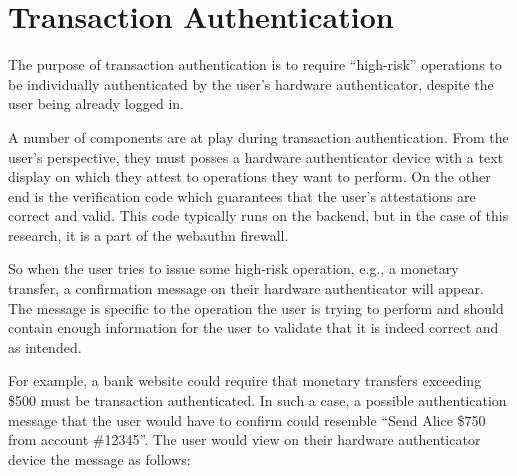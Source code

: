 
\section{Transaction Authentication}

\iffalse
Transaction authentication defends against a class of vulnerabilities not covered by traditional two-factor authentication. 
\fi

The purpose of transaction authentication is to require ``high-risk'' operations to be individually authenticated by the user's hardware authenticator, despite the user being already logged in. 

A number of components are at play during transaction authentication. From the user's perspective, they must posses a hardware authenticator device with a text display on which they attest to operations they want to perform. On the other end is the verification code which guarantees that the user's attestations are correct and valid. This code typically runs on the backend, but in the case of this research, it is a part of the webauthn firewall.

So when the user tries to issue some high-risk operation, e.g., a monetary transfer, a confirmation message on their hardware authenticator will appear. The message is specific to the operation the user is trying to perform and should contain enough information for the user to validate that it is indeed correct and as intended. 

For example, a bank website could require that monetary transfers exceeding \$500 must be transaction authenticated. In such a case, a possible authentication message that the user would have to confirm could resemble ``Send Alice \$750 from account \#12345''. The user would view on their hardware authenticator device the message as follows:

